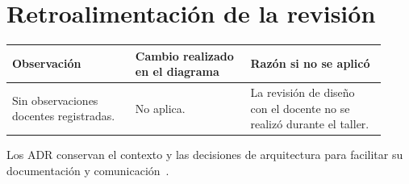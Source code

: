 \section{Retroalimentación de la revisión}

\noindent
\begin{tabular}{@{}p{0.30\linewidth}p{0.29\linewidth}p{0.33\linewidth}@{}}
\hline
\textbf{Observación} &
\textbf{Cambio realizado en el diagrama} &
\textbf{Razón si no se aplicó} \\
\hline
Sin observaciones docentes registradas. &
No aplica. &
La revisión de diseño con el docente no se realizó durante el taller. \\
\hline
\end{tabular}


Los ADR conservan el contexto y las decisiones de arquitectura para facilitar
su documentación y comunicación~\cite{ahmeti2024adr}.
